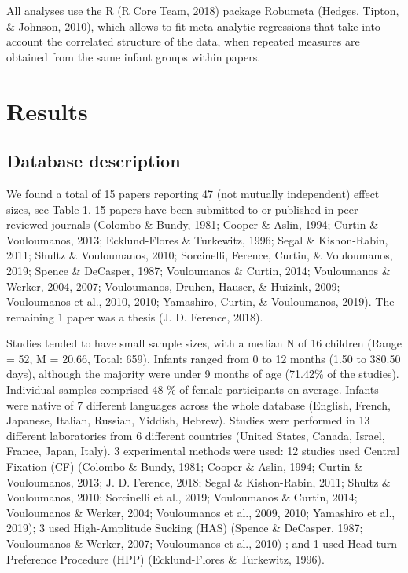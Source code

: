 \documentclass[man]{apa6}
\begin{document}
All analyses use the R (R Core Team, 2018) package Robumeta (Hedges,
Tipton, \& Johnson, 2010), which allows to fit meta-analytic regressions
that take into account the correlated structure of the data, when
repeated measures are obtained from the same infant groups within
papers.

\section{Results}\label{results}

\subsection{Database description}\label{database-description}

We found a total of 15 papers reporting 47 (not mutually independent)
effect sizes, see Table 1. 15 papers have been submitted to or published
in peer-reviewed journals (Colombo \& Bundy, 1981; Cooper \& Aslin,
1994; Curtin \& Vouloumanos, 2013; Ecklund-Flores \& Turkewitz, 1996;
Segal \& Kishon-Rabin, 2011; Shultz \& Vouloumanos, 2010; Sorcinelli,
Ference, Curtin, \& Vouloumanos, 2019; Spence \& DeCasper, 1987;
Vouloumanos \& Curtin, 2014; Vouloumanos \& Werker, 2004, 2007;
Vouloumanos, Druhen, Hauser, \& Huizink, 2009; Vouloumanos et al., 2010,
2010; Yamashiro, Curtin, \& Vouloumanos, 2019). The remaining 1 paper
was a thesis (J. D. Ference, 2018).

Studies tended to have small sample sizes, with a median N of 16
children (Range = 52, M = 20.66, Total: 659). Infants ranged from 0 to
12 months (1.50 to 380.50 days), although the majority were under 9
months of age (71.42\% of the studies). Individual samples comprised 48
\% of female participants on average. Infants were native of 7 different
languages across the whole database (English, French, Japanese, Italian,
Russian, Yiddish, Hebrew). Studies were performed in 13 different
laboratories from 6 different countries (United States, Canada, Israel,
France, Japan, Italy). 3 experimental methods were used: 12 studies used
Central Fixation (CF) (Colombo \& Bundy, 1981; Cooper \& Aslin, 1994;
Curtin \& Vouloumanos, 2013; J. D. Ference, 2018; Segal \& Kishon-Rabin,
2011; Shultz \& Vouloumanos, 2010; Sorcinelli et al., 2019; Vouloumanos
\& Curtin, 2014; Vouloumanos \& Werker, 2004; Vouloumanos et al., 2009,
2010; Yamashiro et al., 2019); 3 used High-Amplitude Sucking (HAS)
(Spence \& DeCasper, 1987; Vouloumanos \& Werker, 2007; Vouloumanos et
al., 2010) ; and 1 used Head-turn Preference Procedure (HPP)
(Ecklund-Flores \& Turkewitz, 1996).
\end{document}
